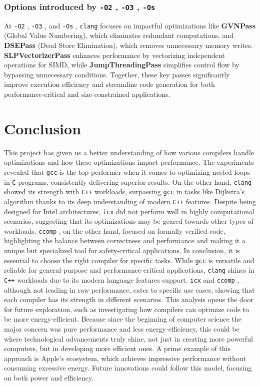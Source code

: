\documentclass{rapport}
\newcommand{\gcc}{\texttt{gcc} }
\newcommand{\icx}{\texttt{icx} }
\newcommand{\clang}{\texttt{clang} }
\newcommand{\comp}{\texttt{ccomp} }
\newcommand{\optitwo}{\texttt{-O2} }
\newcommand{\optithree}{\texttt{-O3} }
\newcommand{\optisize}{\texttt{-Os} }
\begin{document}
\subsubsection{Options introduced by \optitwo, \optithree, \optisize}
At \optitwo, \optithree, and \optisize, \clang focuses on impactful optimizations like \textbf{GVNPass} (Global Value Numbering), which eliminates redundant 
computations, and \textbf{DSEPass} (Dead Store Elimination), which removes unnecessary memory writes. \newline
\textbf{SLPVectorizerPass} enhances performance by vectorizing 
independent operations for SIMD, while \textbf{JumpThreadingPass} simplifies control flow by bypassing unnecessary conditions. Together, these key passes 
significantly improve execution efficiency and streamline code generation for both performance-critical and size-constrained applications.

\section{Conclusion}
This project has given us a better understanding of how various compilers handle optimizations and how these optimizations impact performance. \newline
The experiments revealed that \gcc is the top performer when it comes to optimizing nested loops in \texttt{C} programs, consistently delivering superior results. On the other hand, 
\clang showed its strength with \texttt{C++} workloads, surpassing \gcc in tasks like Dijkstra’s algorithm thanks to its deep understanding of modern \texttt{C++} features.
Despite being designed for Intel architectures, \icx did not perform well in highly computational scenarios, suggesting that its optimizations may be geared towards other types 
of workloads. \comp, on the other hand, focused on formally verified code, highlighting the balance between correctness and performance and making it a unique but specialized tool 
for safety-critical applications.
\newline\newline
In conclusion, it is essential to choose the right compiler for specific tasks. While \gcc is versatile and reliable for general-purpose and performance-critical applications, 
\clang shines in \texttt{C++} workloads due to its modern language features support. \icx and \comp, although not leading in raw performance, cater to specific use cases, showing that 
each compiler has its strength in different scenarios. 
\newline\newline
This analysis opens the door for future exploration, such as investigating how compilers can optimize code to be more energy-efficient. 
Because since the beginning of computer science the major concern was pure performance and less energy-efficiency, this could be where technological advancements truly shine, 
not just in creating more powerful computers, but in developing more efficient ones. 
A prime example of this approach is Apple's ecosystem, which achieves impressive performance without consuming excessive energy. 
Future innovations could follow this model, focusing on both power and efficiency.

\clearpage
\nocite{*}


\end{document}
